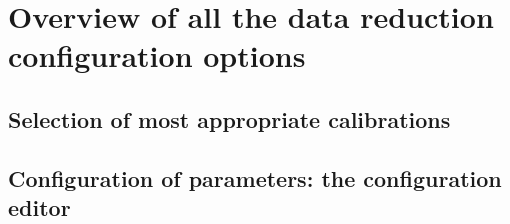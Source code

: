 \section{Overview of all the data reduction configuration options}
\label{sec:configuration_overview}

\subsection{Selection of most appropriate calibrations}



\subsection{Configuration of parameters: the configuration editor}
\label{sec:configuration_editor}




